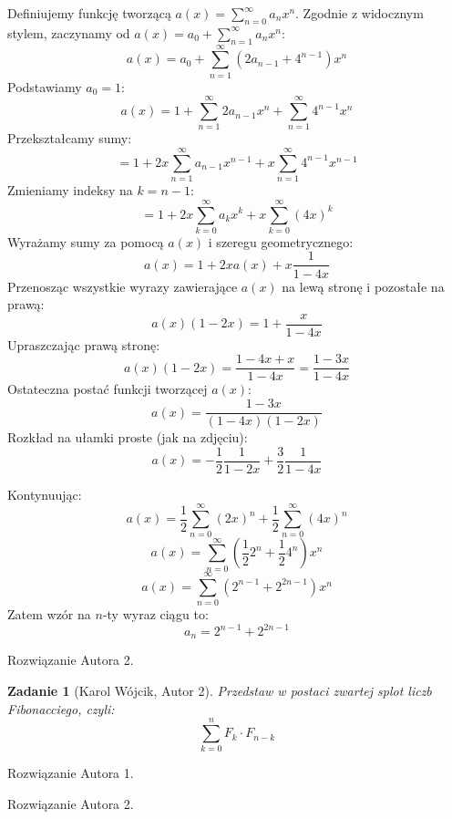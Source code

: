 \documentclass{mwart}
\newtheorem{zad}{Zadanie}[section]
\begin{document}
\begin{mdframed}
    Definiujemy funkcję tworzącą $a(x) = \sum_{n=0}^{\infty} a_n x^n$.
    Zgodnie z widocznym stylem, zaczynamy od $a(x) = a_0 + \sum_{n=1}^{\infty} a_n x^n$:
    $$ a(x) = a_0 + \sum_{n=1}^{\infty} (2a_{n-1} + 4^{n-1}) x^n $$
    Podstawiamy $a_0 = 1$:
    $$ a(x) = 1 + \sum_{n=1}^{\infty} 2a_{n-1} x^n + \sum_{n=1}^{\infty} 4^{n-1} x^n $$
    Przekształcamy sumy:
    $$ = 1 + 2x \sum_{n=1}^{\infty} a_{n-1} x^{n-1} + x \sum_{n=1}^{\infty} 4^{n-1} x^{n-1} $$
    Zmieniamy indeksy na $k=n-1$:
    $$ = 1 + 2x \sum_{k=0}^{\infty} a_k x^k + x \sum_{k=0}^{\infty} (4x)^k $$
    Wyrażamy sumy za pomocą $a(x)$ i szeregu geometrycznego:
    $$ a(x) = 1 + 2x a(x) + x \frac{1}{1-4x} $$
    Przenosząc wszystkie wyrazy zawierające $a(x)$ na lewą stronę i pozostałe na prawą:
    $$ a(x) (1 - 2x) = 1 + \frac{x}{1-4x} $$
    Upraszczając prawą stronę:
    $$ a(x) (1 - 2x) = \frac{1-4x+x}{1-4x} = \frac{1-3x}{1-4x} $$
    Ostateczna postać funkcji tworzącej $a(x)$:
    $$ a(x) = \frac{1-3x}{(1-4x)(1-2x)} $$
    Rozkład na ułamki proste (jak na zdjęciu):
    $$ a(x) = -\frac{1}{2} \frac{1}{1-2x} + \frac{3}{2} \frac{1}{1-4x} $$

    Kontynuując:
    $$ a(x) = \frac{1}{2} \sum_{n=0}^{\infty} (2x)^n + \frac{1}{2} \sum_{n=0}^{\infty} (4x)^n $$
    $$ a(x) = \sum_{n=0}^{\infty} \left( \frac{1}{2} 2^n + \frac{1}{2} 4^n \right) x^n $$
    $$ a(x) = \sum_{n=0}^{\infty} (2^{n-1} + 2^{2n-1}) x^n $$
    Zatem wzór na $n$-ty wyraz ciągu to:
    $$ a_n = 2^{n-1} + 2^{2n-1} $$
\end{mdframed}
\begin{mdframed}
    Rozwiązanie Autora 2.
\end{mdframed}

\begin{zad}[Karol Wójcik, Autor 2]
    Przedstaw w postaci zwartej splot liczb Fibonacciego, czyli:
    \[\sum_{k=0}^{n}F_k\cdot F_{n-k}\]
\end{zad}
\begin{mdframed}
    Rozwiązanie Autora 1.
\end{mdframed}
\begin{mdframed}
    Rozwiązanie Autora 2.
\end{mdframed}
\end{document}
